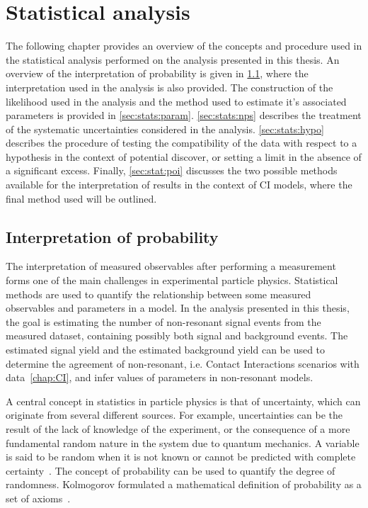 \chapter{Statistical analysis}\label{chap:stats}
The following chapter provides an overview of the concepts and procedure used in the statistical analysis performed on the analysis presented in this thesis. An overview of the interpretation of probability is given in \cref{sec:stats:interp}, where the interpretation used in the analysis is also provided. The construction of the likelihood used in the analysis and the method used to estimate it's associated parameters is provided in \cref{sec:stats:param}. \cref{sec:stats:nps} describes the treatment of the systematic uncertainties considered in the analysis. \cref{sec:stats:hypo} describes the procedure of testing the compatibility of the data with respect to a hypothesis in the context of potential discover, or setting a limit in the absence of a significant excess. Finally, \cref{sec:stat:poi} discusses the two possible methods available for the interpretation of results in the context of CI models, where the final method used will be outlined.

\section{Interpretation of probability}\label{sec:stats:interp}
The interpretation of measured observables after performing a measurement forms one of the main challenges in experimental particle physics. Statistical methods are used to quantify the relationship between some measured observables and parameters in a model. In the analysis presented in this thesis, the goal is estimating the number of non-resonant signal events from the measured dataset, containing possibly both signal and background events. The estimated signal yield and the estimated background yield can be used to determine the agreement of non-resonant, i.e. Contact Interactions scenarios with data~\cref{chap:CI}, and infer values of parameters in non-resonant models. 

A central concept in statistics in particle physics is that of uncertainty, which can originate from several different sources. For example, uncertainties can be the result of the lack of knowledge of the experiment, or the consequence of a more fundamental random nature in the system due to quantum mechanics. A variable is said to be random when it is not known or cannot be predicted with complete certainty~\cite{Cowan1998}. The concept of probability can be used to quantify the degree of randomness. Kolmogorov formulated a mathematical definition of probability as a set of axioms~\cite{Kol33}. 


